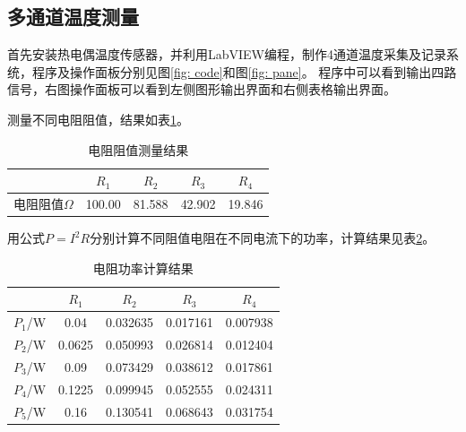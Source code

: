 \documentclass[10pt,a4paper,twoside,UTF8]{ctexart}
\begin{document}
\subsection{多通道温度测量}
首先安装热电偶温度传感器，并利用LabVIEW编程，制作4通道温度采集及记录系统，程序及操作面板分别见图\ref{fig: code}和图\ref{fig: pane}。
程序中可以看到输出四路信号，右图操作面板可以看到左侧图形输出界面和右侧表格输出界面。
\begin{figure}[H]
	\centering
	\caption{}
\end{figure}

测量不同电阻阻值，结果如表\ref{tab: 1}。
\begin{table}[H]
	\centering
	  \begin{tabular}{ccccc}
	  \toprule
	    & $R_1$ & $R_2$ & $R_3$ & $R_4$ \\
		\midrule
	   电阻阻值$\Omega$& 100.00&81.588&42.902&19.846\\
	  \bottomrule
	\end{tabular}
	\caption{电阻阻值测量结果}	  
	\label{tab: 1}
  \end{table}

  用公式$P=I^2 R$分别计算不同阻值电阻在不同电流下的功率，计算结果见表\ref{tab: 2}。
  \begin{table}[H]
	\centering
	  \begin{tabular}{ccccc}
	  \toprule
	  & $R_1$ & $R_2$ & $R_3$ & $R_4$ \\
	  \midrule
	  $P_1$/W&0.04  & 0.032635 & 0.017161 & 0.007938  \\
	  $P_2$/W&0.0625 & 0.050993 & 0.026814 & 0.012404  \\
	  $P_3$/W&0.09  & 0.073429 & 0.038612 & 0.017861  \\
	  $P_4$/W&0.1225 & 0.099945 & 0.052555 & 0.024311  \\
	  $P_5$/W&0.16  & 0.130541 & 0.068643 & 0.031754  \\
	  \bottomrule
	\end{tabular}
	\caption{电阻功率计算结果}	  
	\label{tab: 2}
  \end{table}
  
\end{document}

